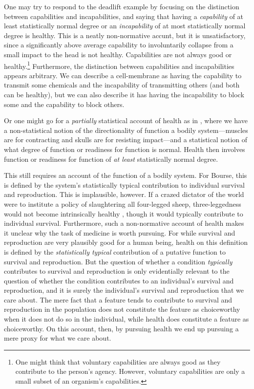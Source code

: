 One may try to respond to the deadlift example by focusing on the distinction between capabilities and incapabilities,
and saying that having a \textit{capability} of at least statistically normal degree or an \textit{incapability} of at 
most statistically normal degree is healthy. This is a neatly non-normative accunt, but it is unsatisfactory, since a significantly above
average capability to involuntarily collapse from a small impact to the head is not healthy. 
 Capabilities are not
always good or healthy.\footnote{One might think that voluntary capabilities are always good as they contribute to
the person's agency. However, voluntary capabilities are only a small subset of an organism's capabilities.}
Furthermore, the distinction between capabilities and incapabilities appears arbitrary. We can describe a
cell-membrane as having the capability to transmit some chemicals and the incapability of transmitting others
(and both can be healthy), but we can also describe it has having the incapability to block some and the capability
to block others.

Or one might go for a \textit{partially} statistical account of health as in , where we have a non-statistical notion of the
directionality of function a bodily system---muscles are for contracting and skulls are for resisting impact---and
a statistical notion of what degree of function or readiness for function is normal. Health then involves 
function or readiness for function of \textit{at least} statistically normal degree. 

This still requires an account of the function of a bodily system. For Bourse, this is defined by the 
system's statistically typical contribution to individual survival and reproduction. This is implausible, however.
If a crazed dictator of the world were to institute a policy of slaughtering all four-legged sheep, 
three-leggedness would not become intrinsically healthy , though it would 
typically contribute to individual survival. Furthermore, such a non-normative account of health makes
it unclear why the task of medicine is worth pursuing. For while survival and reproduction are very plausibly
good for a human being, health on this definition is defined by the \textit{statistically typical}
contribution of a putative function to survival and reproduction. But the question of whether a condition
\textit{typically} contributes to survival and reproduction is only evidentially relevant to the question
of whether the condition contributes to an individual's survival and reproduction, and it is surely 
the individual's survival and reproduction that we care about. The mere fact that a feature tends to
contribute to survival and reproduction in the population does not constitute the feature as choiceworthy when it 
does not do so in the individual, while health does constitute a feature as choiceworthy. On this account, 
then, by pursuing health we end up pursuing a mere proxy for what we care about.

